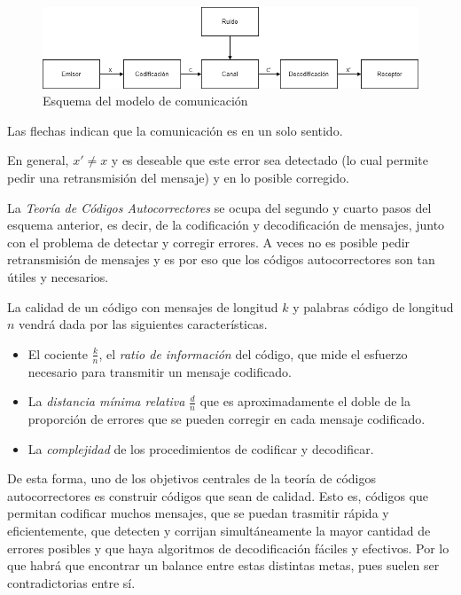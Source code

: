 \begin{figure}[H]
	\center
	\includegraphics[scale=0.5]{figures/Diagrama_comunicacion.png}
	\caption{Esquema del modelo de comunicación}
\end{figure}

Las flechas indican que la comunicación es en un solo sentido.

En general, $x' \neq x$ y es deseable que este error sea detectado (lo cual permite pedir una retransmisión del mensaje) y en lo posible corregido.

La \emph{Teoría de Códigos Autocorrectores} se ocupa del segundo y cuarto pasos del esquema anterior, es decir, de la codificación y decodificación de mensajes, junto con el problema de detectar y corregir errores. A veces no es posible pedir retransmisión de mensajes y es por eso que los códigos autocorrectores son tan útiles y necesarios.

La calidad de un código con mensajes de longitud $k$ y palabras código de longitud $n$ vendrá dada por las siguientes características.

\begin{itemize}
    \item El cociente $\frac{k}{n}$, el \emph{ratio de información} del código, que mide el esfuerzo necesario para transmitir un mensaje codificado.
    \item La \emph{distancia mínima relativa} $\frac{d}{n}$ que es aproximadamente el doble de la proporción de errores que se pueden corregir en cada mensaje codificado.
    \item La \emph{complejidad} de los procedimientos de codificar y decodificar.
\end{itemize}

De esta forma, uno de los objetivos centrales de la teoría de códigos autocorrectores es construir códigos que sean de calidad. Esto es, códigos que permitan codificar muchos mensajes, que se puedan trasmitir rápida y eficientemente, que detecten y corrijan simultáneamente la mayor cantidad de errores posibles y que haya algoritmos de decodificación fáciles y efectivos. Por lo que habrá que encontrar un balance entre estas distintas metas, pues suelen ser contradictorias entre sí.

